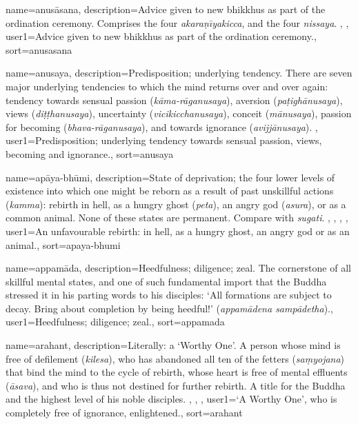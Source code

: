 {
name=anus\=asana,
description={Advice given to new bhikkhus as part of the ordination ceremony. Comprises the four \textit{akara\d{n}\={\i}yakicca}, and the four \textit{nissaya}. \protect \seepre %
\protect {}, \protect {}%
\protect \seepost %
},
user1={Advice given to new bhikkhus as part of the ordination ceremony.},
sort={anusasana}
}

{
name=anusaya,
description={Predisposition; underlying tendency. There are seven major underlying tendencies to which the mind returns over and over again: tendency towards sensual passion (\textit{k\=ama-r\=aganusaya}), aversion (\textit{pa\d{t}i\-gh\=a\-nu\-saya}), views (\textit{di\d{t}\d{t}hanusaya}), uncertainty (\textit{vicikicchanusaya}), conceit (\textit{m\=a\-nu\-saya}), passion for becoming (\textit{bhava-r\=aganusaya}), and towards \mbox{ignorance} (\textit{avijj\=a\-nu\-saya}). \protect \seepre %
\protect {}%
\protect \seepost %
},
user1={Predisposition; underlying tendency towards sensual passion, views, becoming and ignorance.},
sort={anusaya}
}

{
name={ap\=aya-bh\=umi},
description={State of deprivation; the four lower levels of existence into which one might be reborn as a result of past unskillful actions (\textit{kamma}): rebirth in hell, as a hungry ghost (\textit{peta}), an angry god (\textit{asura}), or as a common animal. None of these states are permanent. Compare with \textit{sugati}. \protect \seepre %
\protect {}, \protect {}, \protect {}, \protect {}%
\protect \seepost %
},
user1={An unfavourable rebirth: in hell, as a hungry ghost, an angry god or as an animal.},
sort={apaya-bhumi}
}

{
name={appam\=ada},
description={Heedfulness; diligence; zeal. The cornerstone of all skillful mental states, and one of such fundamental import that the Buddha stressed it in his parting words to his disciples: `All formations are subject to decay. Bring about completion by being heedful!' (\textit{appam\=adena samp\=adetha}).},
user1={Heedfulness; diligence; zeal.},
sort={appamada}
}

{
name={arahant},
description={Literally: a `Worthy One'. A person whose mind is free of defilement (\textit{kilesa}), who has abandoned all ten of the fetters (\textit{sa\d{m}yojana}) that bind the mind to the cycle of rebirth, whose heart is free of mental effluents (\textit{\=asava}), and who is thus not destined for further rebirth. A title for the Buddha and the highest level of his noble disciples. \protect \seepre %
\protect {}, \protect {}, \protect {}%
\protect \seepost %
},
user1={`A Worthy One', who is completely free of ignorance, enlightened.},
sort={arahant}
}


